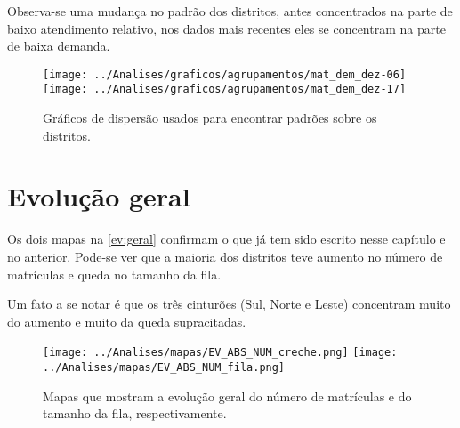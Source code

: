 Observa-se uma mudança no padrão dos distritos, antes concentrados na parte de baixo atendimento relativo, nos dados mais recentes eles se concentram na parte de baixa demanda.

\begin{figure}[H]
	\centering
	\texttt{[image: ../Analises/graficos/agrupamentos/mat\_dem\_dez-06]}
	\texttt{[image: ../Analises/graficos/agrupamentos/mat\_dem\_dez-17]}
	\caption{Gráficos de dispersão usados para encontrar padrões sobre os distritos.}
	\label{graf:geral}
\end{figure}

\section{Evolução geral}

Os dois mapas na \autoref{ev:geral} confirmam o que já tem sido escrito nesse capítulo e no anterior. Pode-se ver que a maioria dos distritos teve aumento no número de matrículas e queda no tamanho da fila.

Um fato a se notar é que os três cinturões (Sul, Norte e Leste) concentram muito do aumento e muito da queda supracitadas.

\begin{figure}[H]
	\centering
	\texttt{[image: ../Analises/mapas/EV\_ABS\_NUM\_creche.png]}
	\texttt{[image: ../Analises/mapas/EV\_ABS\_NUM\_fila.png]}
	\caption{Mapas que mostram a evolução geral do número de matrículas e do tamanho da fila, respectivamente.}
	\label{ev:geral}
\end{figure}

